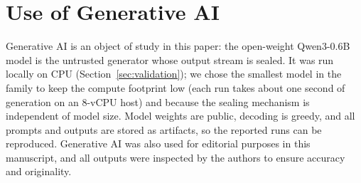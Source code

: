 \documentclass[conference,compsoc]{IEEEtran}
\begin{document}
\section{Use of Generative AI}
\label{app:genai}

Generative AI is an object of study in this paper: the open-weight Qwen3-0.6B model is the untrusted generator whose output stream is sealed. It was run locally on CPU (Section~\ref{sec:validation}); we chose the smallest model in the family to keep the compute footprint low (each run takes about one second of generation on an 8-vCPU host) and because the sealing mechanism is independent of model size. Model weights are public, decoding is greedy, and all prompts and outputs are stored as artifacts, so the reported runs can be reproduced. Generative AI was also used for editorial purposes in this manuscript, and all outputs were inspected by the authors to ensure accuracy and originality.
\end{document}
